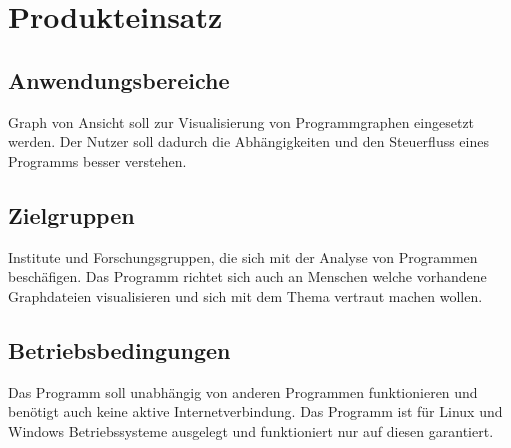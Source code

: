 \chapter{Produkteinsatz}

\section{Anwendungsbereiche}
Graph von Ansicht soll zur Visualisierung von Programmgraphen eingesetzt werden. Der Nutzer soll dadurch die Abhängigkeiten und den Steuerfluss eines Programms besser verstehen.
\section{Zielgruppen}
Institute und Forschungsgruppen, die sich mit der Analyse von Programmen beschäfigen. Das Programm richtet sich auch an Menschen welche vorhandene Graphdateien visualisieren und sich mit dem Thema vertraut machen wollen.

\section{Betriebsbedingungen}
Das Programm soll unabhängig von anderen Programmen funktionieren und benötigt auch keine aktive Internetverbindung. Das Programm ist für Linux und Windows Betriebssysteme ausgelegt und funktioniert nur auf diesen garantiert.